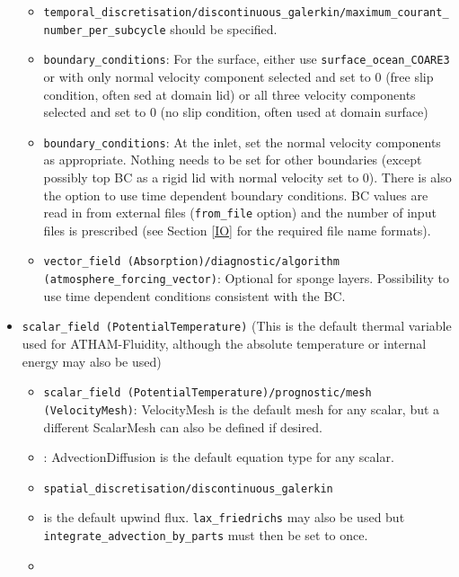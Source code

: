 \documentclass[10pt,a4paper]{article}
\begin{document}
\begin{itemize}
\begin{itemize}
\item \texttt{temporal\_discretisation/discontinuous\_galerkin/maximum\_courant\_number\_per\_subcycle} should be specified.
\item \texttt{boundary\_conditions}: For the surface, either use \texttt{surface\_ocean\_COARE3} or \texttt{} with only normal velocity component selected and set to 0 (free slip condition, often sed at domain lid) or all three velocity components selected and set to 0 (no slip condition, often used at domain surface)
\item \texttt{boundary\_conditions}: At the inlet, set the normal velocity components as appropriate. Nothing needs to be set for other boundaries (except possibly top BC as a rigid lid with normal velocity set to 0). There is also the option to use time dependent boundary conditions. BC values are read in from external files (\texttt{from\_file} option) and the number of input files is prescribed (see Section \ref{IO} for the required file name formats).
\item \texttt{vector\_field (Absorption)/diagnostic/algorithm (atmosphere\_forcing\_vector)}: Optional for sponge layers. Possibility to use time dependent conditions consistent with the BC.
\end{itemize}
\item \texttt{scalar\_field (PotentialTemperature)} (This is the default thermal variable used for ATHAM-Fluidity, although the absolute temperature or internal energy may also be used)
\begin{itemize}
\item \texttt{scalar\_field (PotentialTemperature)/prognostic/mesh (VelocityMesh)}: VelocityMesh is the default mesh for any scalar, but a different ScalarMesh can also be defined if desired.
\item \texttt{}: AdvectionDiffusion is the default equation type for any scalar.
\item \texttt{spatial\_discretisation/discontinuous\_galerkin}
\item \texttt{} is the default upwind flux. \texttt{lax\_friedrichs} may also be used but \texttt{integrate\_advection\_by\_parts} must then be set to once.
\item \texttt{}

\end{itemize}
\end{itemize}
\end{document}

